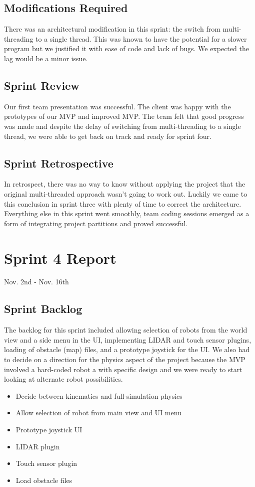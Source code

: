 \subsection{Modifications Required}

There was an architectural modification in this sprint: the switch from multi-threading to a single thread. This was known to have the potential for a slower program but we justified it with ease of code and lack of bugs. We expected the lag would be a minor issue.

\subsection{Sprint Review}
Our first team presentation was successful. The client was happy with the prototypes of our MVP and improved MVP. The team felt that good progress was made and despite the delay of switching from multi-threading to a single thread, we were able to get back on track and ready for sprint four.

\subsection{Sprint Retrospective}
In retrospect, there was no way to know without applying the project that the original multi-threaded approach wasn't going to work out. Luckily we came to this conclusion in sprint three with plenty of time to correct the architecture. Everything else in this sprint went smoothly, team coding sessions emerged as a form of integrating project partitions and proved successful.

\section{Sprint 4 Report}
Nov. 2nd - Nov. 16th
\subsection{Sprint Backlog}

The backlog for this sprint included allowing selection of robots from the world view and a side menu in the UI, implementing LIDAR and touch sensor plugins, loading of obstacle (map) files, and a prototype joystick for the UI. We also had to decide on a direction for the physics aspect of the project because the MVP involved a hard-coded robot a with specific design and we were ready to start looking at alternate robot possibilities.

\begin{itemize}
	\item Decide between kinematics and full-simulation physics
	\item Allow selection of robot from main view and UI menu
	\item Prototype joystick UI
	\item LIDAR plugin
	\item Touch sensor plugin
	\item Load obstacle files
\end{itemize}

